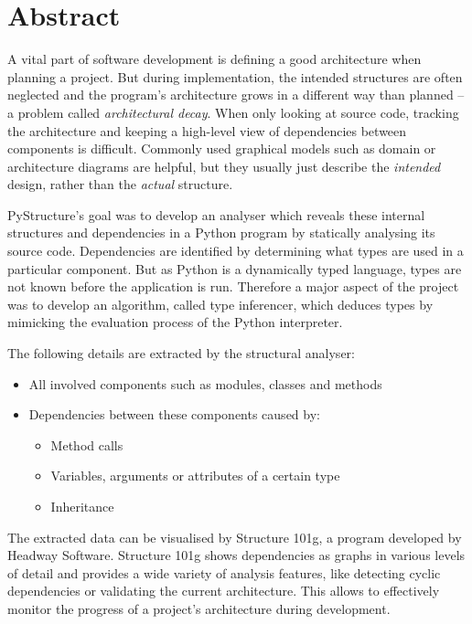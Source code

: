 \documentclass[12pt,halfparskip,DIV11,BCOR10mm]{scrreprt}
\begin{document}
\pagestyle{plain}

\chapter*{Abstract}

A vital part of software development is defining a good architecture when planning a project. But during implementation, the intended structures are often neglected and the program's architecture grows in a different way than planned – a problem called \emph{architectural decay}. When only looking at source code, tracking the architecture and keeping a high-level view of dependencies between components is difficult. Commonly used graphical models such as domain or architecture diagrams are helpful, but they usually just describe the \emph{intended} design, rather than the \emph{actual} structure.

PyStructure's goal was to develop an analyser which reveals these internal structures and dependencies in a Python program by statically analysing its source code. Dependencies are identified by determining what types are used in a particular component. But as Python is a dynamically typed language, types are not known before the application is run. Therefore a major aspect of the project was to develop an algorithm, called type inferencer, which deduces types by mimicking the evaluation process of the Python interpreter.

The following details are extracted by the structural analyser:

\begin{itemize}
    \item All involved components such as modules, classes and methods
    \item Dependencies between these components caused by:
    \begin{itemize}
        \item Method calls
        \item Variables, arguments or attributes of a certain type
        \item Inheritance
    \end{itemize}
\end{itemize}

The extracted data can be visualised by Structure 101g, a program developed by Headway Software. Structure 101g shows dependencies as graphs in various levels of detail and provides a wide variety of analysis features, like detecting cyclic dependencies or validating the current architecture. This allows to effectively monitor the progress of a project's architecture during development.
\end{document}
